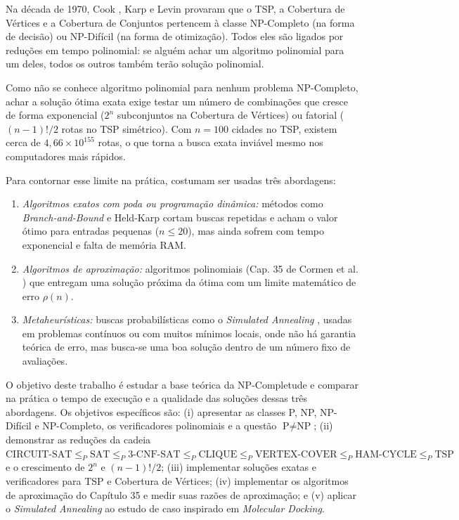 \documentclass[conference]{IEEEtran}
\theoremstyle{definition}
\theoremstyle{plain}
\begin{document}
Na década de 1970, Cook \cite{cook1971complexity}, Karp \cite{karp1972reducibility} e Levin \cite{levin1973universal} provaram que o TSP, a Cobertura de Vértices e a Cobertura de Conjuntos pertencem à classe NP-Completo (na forma de decisão) ou NP-Difícil (na forma de otimização). Todos eles são ligados por reduções em tempo polinomial: se alguém achar um algoritmo polinomial para um deles, todos os outros também terão solução polinomial.

Como não se conhece algoritmo polinomial para nenhum problema NP-Completo, achar a solução ótima exata exige testar um número de combinações que cresce de forma exponencial ($2^n$ subconjuntos na Cobertura de Vértices) ou fatorial ($(n-1)!/2$ rotas no TSP simétrico). Com $n = 100$ cidades no TSP, existem cerca de $4{,}66 \times 10^{155}$ rotas, o que torna a busca exata inviável mesmo nos computadores mais rápidos.

Para contornar esse limite na prática, costumam ser usadas três abordagens:
\begin{enumerate}
    \item \textit{Algoritmos exatos com poda ou programação dinâmica:} métodos como \textit{Branch-and-Bound} e Held-Karp \cite{held1962dynamic} cortam buscas repetidas e acham o valor ótimo para entradas pequenas ($n \le 20$), mas ainda sofrem com tempo exponencial e falta de memória RAM.
    \item \textit{Algoritmos de aproximação:} algoritmos polinomiais (Cap. 35 de Cormen et al. \cite{cormen2012algoritmos}) que entregam uma solução próxima da ótima com um limite matemático de erro $\rho(n)$.
    \item \textit{Metaheurísticas:} buscas probabilísticas como o \textit{Simulated Annealing} \cite{kirkpatrick1983optimization,metropolis1953equation}, usadas em problemas contínuos ou com muitos mínimos locais, onde não há garantia teórica de erro, mas busca-se uma boa solução dentro de um número fixo de avaliações.
\end{enumerate}

O objetivo deste trabalho é estudar a base teórica da NP-Completude e comparar na prática o tempo de execução e a qualidade das soluções dessas três abordagens. Os objetivos específicos são: (i) apresentar as classes P, NP, NP-Difícil e NP-Completo, os verificadores polinomiais e a questão $\text{P} \neq \text{NP}$; (ii) demonstrar as reduções da cadeia $\text{CIRCUIT-SAT} \le_P \text{SAT} \le_P \text{3-CNF-SAT} \le_P \text{CLIQUE} \le_P \text{VERTEX-COVER} \le_P \text{HAM-CYCLE} \le_P \text{TSP}$ e o crescimento de $2^n$ e $(n-1)!/2$; (iii) implementar soluções exatas e verificadores para TSP e Cobertura de Vértices; (iv) implementar os algoritmos de aproximação do Capítulo 35 e medir suas razões de aproximação; e (v) aplicar o \textit{Simulated Annealing} ao estudo de caso inspirado em \textit{Molecular Docking}.
\end{document}
